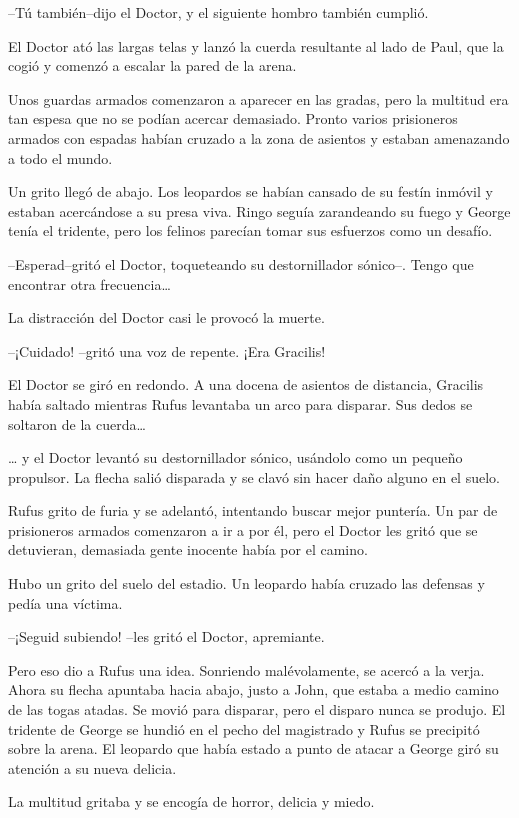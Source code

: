 --Tú también--dijo el Doctor, y el siguiente hombro también cumplió.

El Doctor ató las largas telas y lanzó la cuerda resultante al lado de
Paul, que la cogió y comenzó a escalar la pared de la arena.

Unos guardas armados comenzaron a aparecer en las gradas, pero la
multitud era tan espesa que no se podían acercar demasiado. Pronto
varios prisioneros armados con espadas habían cruzado a la zona de
asientos y estaban amenazando a todo el mundo.

Un grito llegó de abajo. Los leopardos se habían cansado de su festín
inmóvil y estaban acercándose a su presa viva. Ringo seguía zarandeando
su fuego y George tenía el tridente, pero los felinos parecían tomar sus
esfuerzos como un desafío.

--Esperad--gritó el Doctor, toqueteando su destornillador sónico--.
Tengo que encontrar otra frecuencia\ldots{}

La distracción del Doctor casi le provocó la muerte.

--¡Cuidado! --gritó una voz de repente. ¡Era Gracilis!

El Doctor se giró en redondo. A una docena de asientos de distancia,
Gracilis había saltado mientras Rufus levantaba un arco para disparar.
Sus dedos se soltaron de la cuerda\ldots{}

\ldots{} y el Doctor levantó su destornillador sónico, usándolo como un
pequeño propulsor. La flecha salió disparada y se clavó sin hacer daño
alguno en el suelo.

Rufus grito de furia y se adelantó, intentando buscar mejor puntería. Un
par de prisioneros armados comenzaron a ir a por él, pero el Doctor les
gritó que se detuvieran, demasiada gente inocente había por el camino.

Hubo un grito del suelo del estadio. Un leopardo había cruzado las
defensas y pedía una víctima.

--¡Seguid subiendo! --les gritó el Doctor, apremiante.

Pero eso dio a Rufus una idea. Sonriendo malévolamente, se acercó a la
verja. Ahora su flecha apuntaba hacia abajo, justo a John, que estaba a
medio camino de las togas atadas. Se movió para disparar, pero el
disparo nunca se produjo. El tridente de George se hundió en el pecho
del magistrado y Rufus se precipitó sobre la arena. El leopardo que
había estado a punto de atacar a George giró su atención a su nueva
delicia.

La multitud gritaba y se encogía de horror, delicia y miedo.

